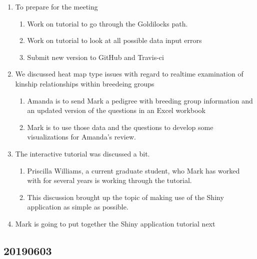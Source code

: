\documentclass[
]{article}
\providecommand{\tightlist}{%
  \setlength{\itemsep}{0pt}\setlength{\parskip}{0pt}}
\begin{document}
\begin{enumerate}
\def\labelenumi{\arabic{enumi}.}
\tightlist
\item
  To prepare for the meeting

  \begin{enumerate}
  \def\labelenumii{\arabic{enumii}.}
  \tightlist
  \item
    Work on tutorial to go through the Goldilocks path.
  \item
    Work on tutorial to look at all possible data input errors
  \item
    Submit new version to GitHub and Travis-ci
  \end{enumerate}
\item
  We discussed heat map type issues with regard to realtime examination
  of kinship relationships within breedeing groups

  \begin{enumerate}
  \def\labelenumii{\arabic{enumii}.}
  \tightlist
  \item
    Amanda is to send Mark a pedigree with breeding group information
    and an updated version of the questions in an Excel workbook
  \item
    Mark is to use those data and the questions to develop some
    visualizations for Amanda's review.
  \end{enumerate}
\item
  The interactive tutorial was discussed a bit.

  \begin{enumerate}
  \def\labelenumii{\arabic{enumii}.}
  \tightlist
  \item
    Priscilla Williams, a current graduate student, who Mark has worked
    with for several years is working through the tutorial.
  \item
    This discussion brought up the topic of making use of the Shiny
    application as simple as possible.
  \end{enumerate}
\item
  Mark is going to put together the Shiny application tutorial next
\end{enumerate}

\hypertarget{section-11}{%
\subsection{20190603}\label{section-11}}
\end{document}
